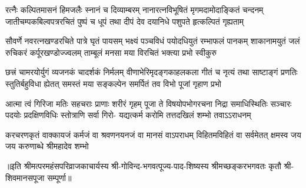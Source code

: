 
\fourlineindentedshloka
{रत्नैः कल्पितमासनं हिमजलैः स्नानं च दिव्याम्बरम्}
{नानारत्नविभूषितं मृगमदामोदाङ्कितं चन्दनम्}
{जातीचम्पकबिल्वपत्ररचितं पुष्पं च धूपं तथा}
{दीपं देव दयानिधे पशुपते हृत्कल्पितं गृह्यताम्}

\fourlineindentedshloka
{सौवर्णे नवरत्नखण्डरचिते पात्रे घृतं पायसम्}
{भक्ष्यं पञ्चविधं पयोदधियुतं रम्भाफलं पानकम्}
{शाकानामयुतं जलं रुचिकरं कर्पूरखण्डोज्ज्वलम्}
{ताम्बूलं मनसा मया विरचितं भक्त्या प्रभो स्वीकुरु}

\fourlineindentedshloka
{छत्त्रं चामरयोर्युगं व्यजनकं चादर्शकं निर्मलम्}
{वीणाभेरिमृदङ्गकाहलकला गीतं च नृत्यं तथा}
{साष्टाङ्गं प्रणतिः स्तुतिर्बहुविधा ह्येतत् समस्तं मया}
{सङ्कल्पेन समर्पितं तव विभो पूजां गृहाण प्रभो}

\fourlineindentedshloka
{आत्मा त्वं गिरिजा मतिः सहचराः प्राणाः शरीरं गृहम्}
{पूजा ते विषयोपभोगरचना निद्रा समाधिस्थितिः}
{सञ्चारः पदयोः प्रदक्षिणविधिः स्तोत्राणि सर्वा गिरो-}
{यद्यत्कर्म करोमि तत्तदखिलं शम्भो तवाऽऽराधनम्}

\fourlineindentedshloka
{करचरणकृतं वाक्कायजं कर्मजं वा}
{श्रवणनयनजं वा मानसं वाऽपराधम्}
{विहितमविहितं वा सर्वमेतत् क्षमस्व}
{जय जय करुणाब्धे श्रीमहादेव शम्भो}

॥इति  श्रीमत्परमहंसपरिव्राजकाचार्यस्य श्री-गोविन्द-भगवत्पूज्य-पाद-शिष्यस्य 
श्रीमच्छङ्करभगवतः कृतौ श्री-शिवमानसपूजा सम्पूर्णा॥
